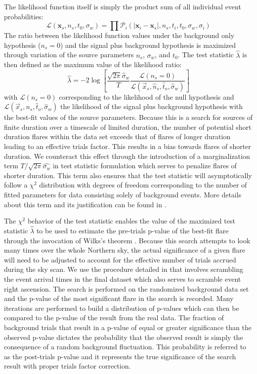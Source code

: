 \documentclass[manuscript]{aastex}
\begin{document}
The likelihood function itself is simply the product sum of all individual event probabilities:
\begin{equation}\label{eq:LLH}
\mathcal{L}(\mathbf{x}_s,n_s,t_0,\sigma_w) = \prod \mathcal{P}_i(|\mathbf{x}_i-\mathbf{x}_s|,n_s,t_i,t_0,\sigma_w,\sigma_i)
\end{equation}
The ratio between the likelihood function values under the background only hypothesis ($n_s=0$) and the signal plus background hypothesis is maximized through variation of the source parameters $n_s$, $\sigma_w$, and $t_0$. The test statistic $\hat{\lambda}$ is then defined as the maximum value of the likelihood ratio:
\begin{equation}\label{eq:TS}
\hat{\lambda} = -2\log \left[\frac{\sqrt{2\pi}\hat{\sigma}_w}{T}\frac{\mathcal{L}(n_s = 0)}{\mathcal{L}(\vec{x}_s,\hat{n}_s,\hat{t}_o,\hat{\sigma}_w)} \right]
\end{equation}
with $\mathcal{L}(n_s = 0)$ corresponding to the likelihood of the null hypothesis and $\mathcal{L}(\vec{x}_s,{n}_s,\hat{t}_o,\hat{\sigma}_w)$ the likelihood of the signal plus background hypothesis with the best-fit values of the source parameters. Because this is a search for sources of finite duration over a timescale of limited duration, the number of potential short duration flares within the data set exceeds that of flares of longer duration leading to an effective trials factor. This results in a bias towards flares of shorter duration. We counteract this effect through the introduction of a marginalization term $T/\sqrt{2\pi}\hat{\sigma_w}$ in test statistic formulation which serves to penalize flares of shorter duration. This term also ensures that the test statistic will asymptotically follow a $\chi^2$ distribution with degrees of freedom corresponding to the number of fitted parameters for data consisting solely of background events. More details about this term and its justification can be found in \cite{2010APh....33..175B}.

The $\chi^2$ behavior of the test statistic enables the value of the maximized test statistic $\hat{\lambda}$ to be used to estimate the pre-trials p-value of the best-fit flare through the invocation of Wilks's theorem \citep{wilks1938}. Because this search attempts to look many times over the whole Northern sky, the actual significance of a given flare will need to be adjusted to account for the effective number of trials accrued during the sky scan. We use the procedure detailed in \cite{2015arXiv150300598A} that involves scrambling the event arrival times in the final dataset which also serves to scramble event right ascension. The search is performed on the randomized background data set and the p-value of the most significant flare in the search is recorded. Many iterations are performed to build a distribution of p-values which can then be compared to the p-value of the result from the real data. The fraction of background trials that result in a p-value of equal or greater significance than the observed p-value dictates the probability that the observed result is simply the consequence of a random background fluctuation. This probability is referred to as the post-trials p-value and it represents the true significance of the search result with proper trials factor correction.
\end{document}
